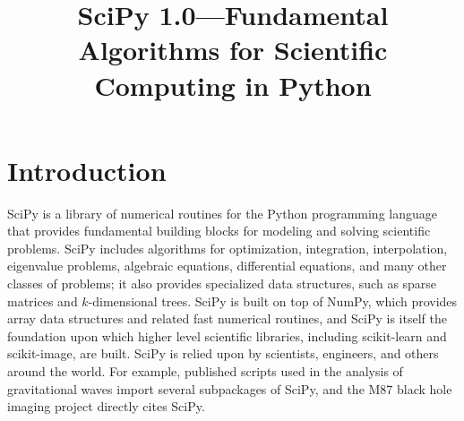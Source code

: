\documentclass[fleqn,10pt]{wlscirep}
\title{SciPy 1.0---Fundamental Algorithms for Scientific Computing in Python}
\begin{document}
\flushbottom
\maketitle
\thispagestyle{empty}

\section*{Introduction}




SciPy is a library of numerical routines for the Python programming
language that provides fundamental building blocks for modeling and
solving scientific problems.
SciPy includes algorithms for optimization, integration, interpolation,
eigenvalue problems, algebraic equations, differential equations, and many other
classes of problems; it also provides
specialized data structures, such as sparse matrices
and $k$-dimensional trees. SciPy is built on top of
NumPy\cite{oliphant2006guide, vanderwalt2011numpy},
which provides array data structures and related fast numerical routines, and
SciPy is itself the foundation upon which higher level scientific libraries,
including scikit-learn\cite{pedregosa2011scikit}
and scikit-image\cite{vanderwalt2014scikit}, are built.
SciPy is relied upon by scientists, engineers, and others
around the world. For example, published
scripts\cite{alex_nitz_2018_1596771, LIGO-open}
used in the analysis of gravitational waves
\cite{PhysRevD.93.122003, abbott2017gw170817}
import several subpackages of SciPy, and the M87 black
hole imaging project directly cites SciPy\cite{2019ApJ875L3E}.
\end{document}
